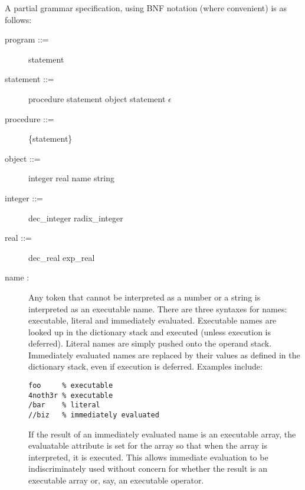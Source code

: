 A partial grammar specification, using BNF notation (where convenient) is as
follows:

\begin{description}
\item[{\lt}program{\gt} ::= ] {\lt}statement{\gt}

\item[{\lt}statement{\gt} ::= ] {\lt}procedure{\gt} {\lt}statement{\gt} {\pipe}
{\lt}object{\gt} {\lt}statement{\gt} {\pipe} $\epsilon$

\item[{\lt}procedure{\gt} ::= ] \{{\lt}statement{\gt}\}

\item[{\lt}object{\gt} ::= ] {\lt}integer{\gt} {\pipe} {\lt}real{\gt} {\pipe}
{\lt}name{\gt} {\pipe} {\lt}string{\gt}

\item[{\lt}integer{\gt} ::= ] {\lt}dec\_integer{\gt} {\pipe}
{\lt}radix\_integer{\gt}

\item[{\lt}real{\gt} ::= ] {\lt}dec\_real{\gt} {\pipe} {\lt}exp\_real{\gt}

\item[{\lt}name{\gt} : ] Any token that cannot be interpreted as a number or a
string is interpreted as an executable name.  There are three syntaxes for
names: executable, literal and immediately evaluated.  Executable names are
looked up in the dictionary stack and executed (unless execution is deferred).
Literal names are simply pushed onto the operand stack.  Immediately evaluated
names are replaced by their values as defined in the dictionary stack, even if
execution is deferred.  Examples include:
\begin{verbatim}
foo     % executable
4noth3r % executable
/bar    % literal
//biz   % immediately evaluated
\end{verbatim}

If the result of an immediately evaluated name is an executable array, the
evaluatable attribute is set for the array so that when the array is
interpreted, it is executed.  This allows immediate evaluation to be
indiscriminately used without concern for whether the result is an executable
array or, say, an executable operator.


\end{description}
